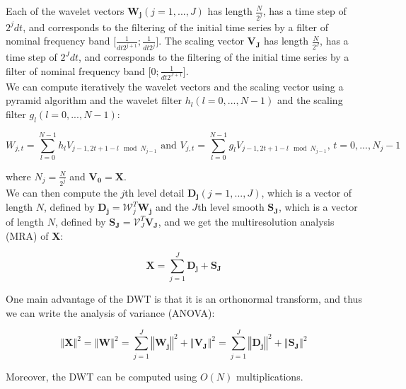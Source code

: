 \documentclass[main.tex]{subfiles}
\begin{document}
Each of the wavelet vectors $\bm{W_j} \left( j = 1 , ... , J \right)$ has length $\frac{N}{2^j}$, has a time step of $2^j dt$, and corresponds to the filtering of the initial time series by a filter of nominal frequency band $\lbrack \frac{1}{dt 2^{j + 1}} ; \frac{1}{dt 2^j} \rbrack$. The scaling vector $\bm{V_J}$ has length $\frac{N}{2^J}$, has a time step of $2^J dt$, and corresponds to the filtering of the initial time series by a filter of nominal frequency band $\lbrack 0 ; \frac{1}{dt 2^{J + 1}} \rbrack$. \\

We can compute iteratively the wavelet vectors and the scaling vector using a pyramid algorithm and the wavelet filter $h_l \left( l = 0 , ... , N - 1 \right)$ and the scaling filter $g_l \left( l = 0 , ... , N - 1 \right)$:

\begin{equation}
W_{j , t} = \sum_{l = 0}^{N - 1} h_l V_{j - 1 , 2 t + 1 - l \mod N_{j - 1}} \text{ and } V_{j , t} = \sum_{l = 0}^{N - 1} g_l V_{j - 1 , 2 t + 1 - l \mod N_{j - 1}} \text{, } t = 0 , ... , N_j - 1
\end{equation}

where $N_j = \frac{N}{2^j}$ and $\bm{V_0} = \bm{X}$. \\

We can then compute the $j$th level detail $\bm{D_j} \left( j = 1 , ... , J \right)$, which is a vector of length $N$, defined by $\bm{D_j} = \mathcal{W}_j^T \bm{W_j}$ and the $J$th level smooth $\bm{S_J}$, which is a vector of length $N$, defined by $\bm{S_J} = \mathcal{V}_J^T \bm{V_J}$, and we get the multiresolution analysis (MRA) of $\bm{X}$:

\begin{equation}
\bm{X} = \sum_{j = 1}^{J} \bm{D_j} + \bm{S_J}
\end{equation}

One main advantage of the DWT is that it is an orthonormal transform, and thus we can write the analysis of variance (ANOVA):

\begin{equation}
\left\Vert \bm{X} \right\Vert ^2 = \left\Vert \bm{W} \right\Vert ^2 = \sum_{j = 1}^{J} \left\Vert \bm{W_j} \right\Vert ^2 + \left\Vert \bm{V_J} \right\Vert ^2 = \sum_{j = 1}^{J} \left\Vert \bm{D_j} \right\Vert ^2 + \left\Vert \bm{S_J} \right\Vert ^2
\end{equation}

Moreover, the DWT can be computed using $O \left( N \right)$ multiplications. \\
\end{document}

